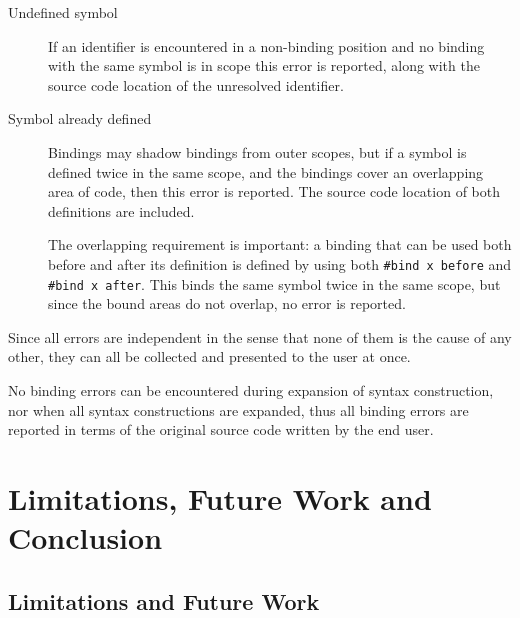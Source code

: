\documentclass{kththesis}
\begin{document}
\begin{description}
  \item[Undefined symbol] If an identifier is encountered in a non-binding position and no binding with the same symbol is in scope this error is reported, along with the source code location of the unresolved identifier.

  \item[Symbol already defined] Bindings may shadow bindings from outer scopes, but if a symbol is defined twice in the same scope, and the bindings cover an overlapping area of code, then this error is reported. The source code location of both definitions are included.

  The overlapping requirement is important: a binding that can be used both before and after its definition is defined by using both \texttt{#bind x before} and \texttt{#bind x after}. This binds the same symbol twice in the same scope, but since the bound areas do not overlap, no error is reported.
\end{description}

Since all errors are independent in the sense that none of them is the cause of any other, they can all be collected and presented to the user at once.

No binding errors can be encountered during expansion of syntax construction, nor when all syntax constructions are expanded, thus all binding errors are reported in terms of the original source code written by the end user.

\chapter{Limitations, Future Work and Conclusion}

\section{Limitations and Future Work}
\end{document}
